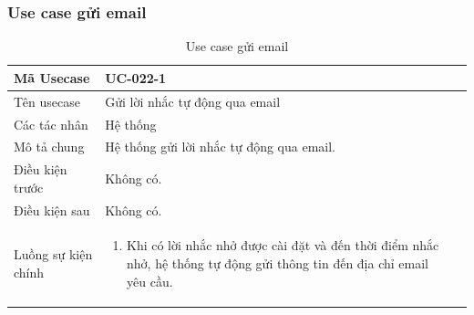 \documentclass[12pt,a4paper]{article}
\begin{document}
    \subsubsection*{Use case gửi email}
    \begin{table}[H]
        \centering
        \begin{tabular}{|p{3.5cm}|p{11.5cm}|c|}
            \hline
            Mã Usecase      & UC-022-1                                 \\
            \hline
            Tên usecase     & Gửi lời nhắc tự động qua email           \\
            \hline
            Các tác nhân    & Hệ thống                                 \\
            \hline
            Mô tả chung     & Hệ thống gửi lời nhắc tự động qua email. \\
            \hline

            Điều kiện trước & Không có.                                \\
            \hline

            Điều kiện sau   & Không có.                                \\
            \hline

            Luồng sự kiện chính & \vspace{-.8cm}\begin{enumerate}
                                                    \item Khi có lời nhắc nhở được cài đặt và đến thời điểm nhắc nhở, hệ thống tự động gửi thông tin đến địa chỉ email yêu cầu.
            \end{enumerate}
            \\
            \hline
        \end{tabular}
        \caption{Use case gửi email}

    \end{table}

\end{document}
